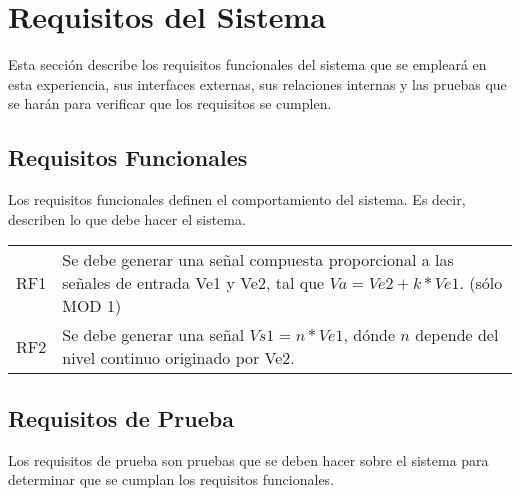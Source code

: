 \section{Requisitos del Sistema}

Esta sección describe los requisitos funcionales del sistema que se empleará en esta experiencia, sus interfaces externas, sus relaciones internas  y las pruebas que se harán para verificar que los requisitos se cumplen.

\subsection{Requisitos Funcionales}

Los requisitos funcionales definen el comportamiento del sistema. Es decir, describen lo que debe hacer el sistema.\\[-0.9cm]

\begin{table}[h]
\centering
\begin{tabular}{p{} p{}}
RF1 & Se debe generar una señal compuesta proporcional a las señales de entrada Ve1 y Ve2, tal que $Va = Ve2 + k*Ve1$. (sólo MOD 1) \\
RF2 & Se debe generar una señal $Vs1 = n*Ve1$, dónde $n$ depende del nivel continuo 	originado por Ve2.\\[-0.9cm]
\end{tabular}
\end{table}

\subsection{Requisitos de Prueba}
Los requisitos de prueba son pruebas que se deben hacer sobre el sistema para determinar que se cumplan los requisitos funcionales.\\[-0.8cm]

